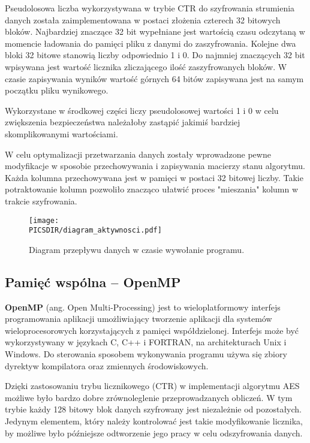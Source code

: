 \documentclass[a4paper,12pt]{article}
\def\PICSDIR{PICS}
\begin{document}
Pseudolosowa liczba wykorzystywana w trybie CTR do szyfrowania strumienia danych została zaimplementowana w postaci złożenia czterech 32 bitowych bloków. Najbardziej znaczące 32 bit wypełniane jest wartością czasu odczytaną w momencie ładowania do pamięci pliku z danymi do zaszyfrowania. Kolejne dwa bloki 32 bitowe stanowią liczby odpowiednio 1 i 0. Do najmniej znaczących 32 bit wpisywana jest wartość licznika zliczającego ilość zaszyfrowanych bloków. W czasie zapisywania wyników wartość górnych 64 bitów zapisywana jest na samym początku pliku wynikowego.

Wykorzystane w środkowej części liczy pseudolosowej wartości 1 i 0 w celu zwiększenia bezpieczeństwa należałoby zastąpić jakimiś bardziej skomplikowanymi wartościami.

W celu optymalizacji przetwarzania danych zostały wprowadzone pewne modyfikacje w sposobie przechowywania i zapisywania macierzy stanu algorytmu. Każda kolumna przechowywana jest w pamięci w postaci 32 bitowej liczby. Takie potraktowanie kolumn pozwoliło znacząco ułatwić proces "mieszania" kolumn w trakcie szyfrowania.

\begin{figure}
\centering
\texttt{[image: \\PICSDIR/diagram\_aktywnosci.pdf]}
\caption{Diagram przepływu danych w czasie wywołanie programu.}
\label{rys:da}
\end{figure}

\subsection{Pamięć wspólna -- OpenMP}
\textbf{OpenMP} (ang. Open Multi-Processing)  jest to wieloplatformowy interfejs programowania aplikacji umożliwiający tworzenie aplikacji dla systemów wieloprocesorowych korzystających z pamięci współdzielonej. Interfejs może być wykorzystywany w językach C, C++ i FORTRAN, na architekturach Unix i Windows. Do sterowania sposobem wykonywania programu używa się zbiory dyrektyw kompilatora oraz zmiennych środowiskowych.

Dzięki zastosowaniu trybu licznikowego (CTR) w implementacji algorytmu AES możliwe było bardzo dobre zrównoleglenie przeprowadzanych obliczeń. W tym trybie każdy 128 bitowy blok danych szyfrowany jest niezależnie od pozostałych. Jedynym elementem, który należy kontrolować jest takie modyfikowanie licznika, by możliwe było późniejsze odtworzenie jego pracy w celu odszyfrowania danych.
\end{document}
